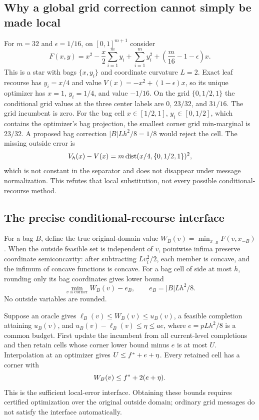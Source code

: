 \subsection{Why a global grid correction cannot simply be made local}
For $m=32$ and $\epsilon=1/16$, on $[0,1]^{m+1}$ consider
\[
F(x,y)=x^2-\frac x2\sum_{i=1}^m y_i+\sum_{i=1}^m y_i^2
+\left(\frac m{16}-1-\epsilon\right)x.
\]
This is a star with bags $\{x,y_i\}$ and coordinate curvature $L=2$.
Exact leaf recourse has $y_i=x/4$ and value
$V(x)=-x^2+(1-\epsilon)x$, so its unique optimizer has
$x=1$, $y_i=1/4$, and value $-1/16$.
On the grid $\{0,1/2,1\}$ the conditional grid values at the three
center labels are $0$, $23/32$, and $31/16$. The grid incumbent is zero.
For the bag cell $x\in[1/2,1]$, $y_i\in[0,1/2]$, which contains the
optimizer's bag projection, the smallest corner grid min-marginal is
$23/32$. A proposed bag correction $|B|Lh^2/8=1/8$ would reject the
cell. The missing outside error is
\[
V_h(x)-V(x)=m\operatorname{dist}(x/4,\{0,1/2,1\})^2,
\]
which is not constant in the separator and does not disappear under
message normalization. This refutes that local substitution, not every
possible conditional-recourse method.

\subsection{The precise conditional-recourse interface}
For a bag $B$, define the true original-domain value
$W_B(v)=\min_{x_{-B}}F(v,x_{-B})$. When the outside feasible set is
independent of $v$, pointwise infima preserve coordinate semiconcavity:
after subtracting $Lv_i^2/2$, each member is concave, and the infimum
of concave functions is concave. For a bag cell of side at most $h$,
rounding only its bag coordinates gives lower bound
\[
\min_{v\text{ a corner}}W_B(v)-e_B,
\qquad e_B=|B|Lh^2/8.
\]
No outside variables are rounded.

Suppose an oracle gives $\ell_B(v)\le W_B(v)\le u_B(v)$, a feasible
completion attaining $u_B(v)$, and $u_B(v)-\ell_B(v)\le\eta\le ae$,
where $e=pLh^2/8$ is a common budget. First update the incumbent from
all current-level completions and then retain cells whose corner lower
bound minus $e$ is at most $U$. Interpolation at an optimizer gives
$U\le f^*+e+\eta$. Every retained cell has a corner with
\[
W_B(v)\le f^*+2(e+\eta).
\]
This is the sufficient local-error interface. Obtaining these bounds
requires certified optimization over the original outside domain;
ordinary grid messages do not satisfy the interface automatically.


